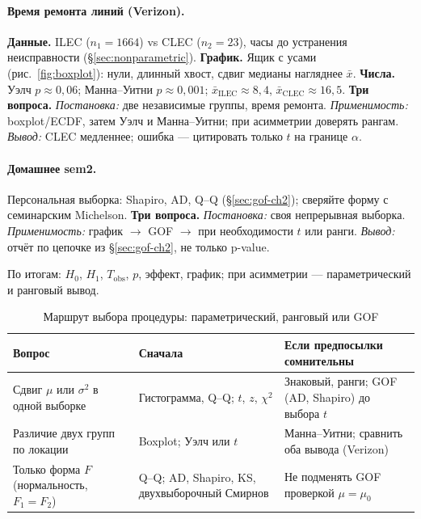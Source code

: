 \paragraph{Время ремонта линий (Verizon).}
\textbf{Данные.} ILEC ($n_1=1664$) vs CLEC ($n_2=23$), часы до устранения неисправности (\S\ref{sec:nonparametric}).
\textbf{График.} Ящик с усами (рис.~\ref{fig:boxplot}): нули, длинный хвост, сдвиг медианы нагляднее $\bar x$.
\textbf{Числа.} Уэлч $p\approx 0{,}06$; Манна--Уитни $p\approx 0{,}001$; $\bar x_{\text{ILEC}}\approx 8{,}4$, $\bar x_{\text{CLEC}}\approx 16{,}5$.
\medskip\noindent\textbf{Три вопроса.} \textit{Постановка:} две независимые группы, время ремонта. 
\textit{Применимость:} boxplot/ECDF, затем Уэлч и Манна--Уитни; при асимметрии доверять рангам. 
\textit{Вывод:} CLEC медленнее; ошибка --- цитировать только $t$ на границе $\alpha$.\medskip

\paragraph{Домашнее sem2.}
Персональная выборка: Shapiro, AD, Q--Q (\S\ref{sec:gof-ch2}); сверяйте форму с семинарским Michelson.
\medskip\noindent\textbf{Три вопроса.} \textit{Постановка:} своя непрерывная выборка. 
\textit{Применимость:} график $\to$ GOF $\to$ при необходимости $t$ или ранги. 
\textit{Вывод:} отчёт по цепочке из \S\ref{sec:gof-ch2}, не только p-value.\medskip

По итогам: $H_0$, $H_1$, $T_{\mathrm{obs}}$, $p$, эффект, график; при асимметрии --- параметрический и ранговый вывод.

\begin{table}[htbp]
\centering
\caption{Маршрут выбора процедуры: параметрический, ранговый или GOF}
\label{tab:ch2-route}
\footnotesize
\begin{tabularx}{\linewidth}{|l|X|X|}
\hline
\textbf{Вопрос} & \textbf{Сначала} & \textbf{Если предпосылки сомнительны} \\
\hline
Сдвиг $\mu$ или $\sigma^2$ в одной выборке & Гистограмма, Q--Q; $t$, $z$, $\chi^2$ & Знаковый, ранги; GOF (AD, Shapiro) до выбора $t$ \\
\hline
Различие двух групп по локации & Boxplot; Уэлч или $t$ & Манна--Уитни; сравнить оба вывода (Verizon) \\
\hline
Только форма $F$ (нормальность, $F_1=F_2$) & Q--Q; AD, Shapiro, KS, двухвыборочный Смирнов & Не подменять GOF проверкой $\mu=\mu_0$ \\
\hline
\end{tabularx}
\end{table}

